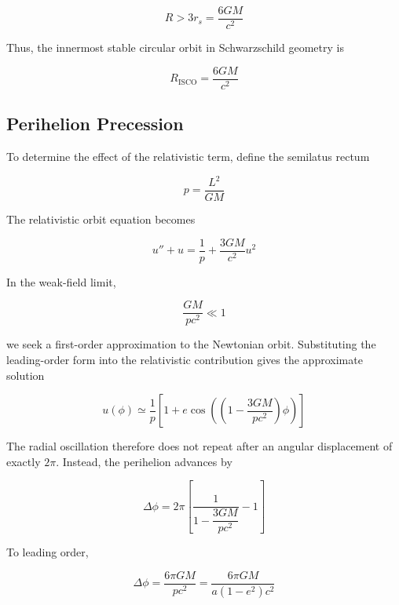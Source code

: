 \documentclass[pdflatex,sn-mathphys-num]{sn-jnl}%
\theoremstyle{thmstyleone}%
\theoremstyle{thmstyletwo}%
\theoremstyle{thmstylethree}%
\begin{document}
\begin{appendices}
\begin{equation}
R>3r_s
=
\frac{6GM}{c^2}
\end{equation}

Thus, the innermost stable circular orbit in Schwarzschild geometry is

\begin{equation}
\boxed{
R_{\mathrm{ISCO}}=\frac{6GM}{c^2}
}
\end{equation}


\subsection{Perihelion Precession}

To determine the effect of the relativistic term, define the semilatus rectum

\begin{equation}
    p=\frac{L^2}{GM}
\end{equation}

The relativistic orbit equation becomes

\begin{equation}
    u''+u
    =
    \frac{1}{p}
    +
    \frac{3GM}{c^2}u^2
\end{equation}

In the weak-field limit,

\begin{equation}
    \frac{GM}{pc^2}\ll1
\end{equation}

we seek a first-order approximation to the Newtonian orbit. Substituting the leading-order form into the relativistic contribution gives the approximate solution

\begin{equation}
    u(\phi)
    \simeq
    \frac{1}{p}
    \left[
        1+
        e\cos\left(
            \left(1-\frac{3GM}{pc^2}\right)\phi
        \right)
    \right]
\end{equation}

The radial oscillation therefore does not repeat after an angular displacement of exactly $2\pi$. Instead, the perihelion advances by

\begin{equation}
    \Delta\phi
    =
    2\pi
    \left[
        \frac{1}{1-\dfrac{3GM}{pc^2}}-1
    \right]
\end{equation}

To leading order,

\begin{equation}
    \boxed{
    \Delta\phi
    =
    \frac{6\pi GM}{pc^2}
    =
    \frac{6\pi GM}
    {a(1-e^2)c^2}
    }
\end{equation}


\end{appendices}
\end{document}
